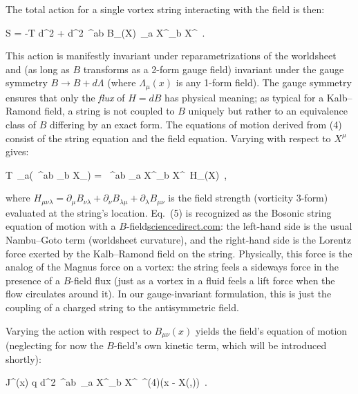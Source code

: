 \documentclass[12pt]{article}
\begin{document}
The total action for a single vortex string interacting with the field is then:


S = -T \int d^2\sigma \sqrt{-\gamma} \;+\; \int d^2\sigma\, \epsilon^{ab} B_{\mu\nu}(X)\, \partial_a X^\mu \partial_b X^\nu~. 


This action is manifestly invariant under reparametrizations of the worldsheet and (as long as $B$ transforms as a 2-form gauge field) invariant under the gauge symmetry $B \to B + d\Lambda$ (where $\Lambda_\mu(x)$ is any 1-form field). The gauge symmetry ensures that only the \textit{flux} of $H=dB$ has physical meaning; as typical for a Kalb–Ramond field, a string is not coupled to $B$ uniquely but rather to an equivalence class of $B$ differing by an exact form. The equations of motion derived from (4) consist of the string equation and the field equation. Varying with respect to $X^\mu$ gives:


T\, \partial_a\!\Big(\sqrt{-\gamma}\, \gamma^{ab} \partial_b X_\mu\Big) \;=\; \, \epsilon^{ab} \partial_a X^\nu \partial_b X^\lambda\, H_{\mu\nu\lambda}(X)~, 


where $H_{\mu\nu\lambda} = \partial_\mu B_{\nu\lambda} + \partial_\nu B_{\lambda\mu} + \partial_\lambda B_{\mu\nu}$ is the field strength (vorticity 3-form) evaluated at the string’s location. Eq. (5) is recognized as the Bosonic string equation of motion with a $B$-field\href{https://www.sciencedirect.com/science/article/abs/pii/0370269373905935#:~:text=Construction%20of%20Pomeron%20states%20in,View%20full}{sciencedirect.com}: the left-hand side is the usual Nambu–Goto term (worldsheet curvature), and the right-hand side is the Lorentz force exerted by the Kalb–Ramond field on the string. Physically, this force is the analog of the Magnus force on a vortex: the string feels a sideways force in the presence of a $B$-field flux (just as a vortex in a fluid feels a lift force when the flow circulates around it). In our gauge-invariant formulation, this is just the coupling of a charged string to the antisymmetric field.


Varying the action with respect to $B_{\mu\nu}(x)$ yields the field’s equation of motion (neglecting for now the $B$-field’s own kinetic term, which will be introduced shortly):


J^{\mu\nu}(x) \;\equiv\; q \int d^2\sigma\, \epsilon^{ab}\, \partial_a X^\mu \partial_b X^\nu\, \delta^{(4)}(x - X(\tau,\sigma))~.  \]
\end{document}
